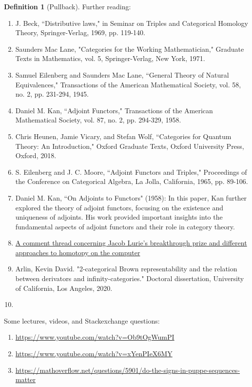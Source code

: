 \documentclass{book}
\theoremstyle{definition}
\newtheorem{definition}{Definition}
\begin{document}
\begin{definition}[Pullback]
Further reading:

\begin{enumerate}
\item J. Beck, ``Distributive laws," in Seminar on Triples and Categorical Homology Theory, Springer-Verlag, 1969, pp. 119-140.
\item Saunders Mac Lane, "Categories for the Working Mathematician," Graduate Texts in Mathematics, vol. 5, Springer-Verlag, New York, 1971.
\item Samuel Eilenberg and Saunders Mac Lane, ``General Theory of Natural Equivalences," Transactions of the American Mathematical Society, vol. 58, no. 2, pp. 231-294, 1945.
\item Daniel M. Kan, ``Adjoint Functors," Transactions of the American Mathematical Society, vol. 87, no. 2, pp. 294-329, 1958.
\item Chris Heunen, Jamie Vicary, and Stefan Wolf, ``Categories for Quantum Theory: An Introduction," Oxford Graduate Texts, Oxford University Press, Oxford, 2018.
\item S. Eilenberg and J. C. Moore, ``Adjoint Functors and Triples," Proceedings of the Conference on Categorical Algebra, La Jolla, California, 1965, pp. 89-106.
\item Daniel M. Kan, ``On Adjoints to Functors" (1958): In this paper, Kan further explored the theory of adjoint functors, focusing on the existence and uniqueness of adjoints. His work provided important insights into the fundamental aspects of adjoint functors and their role in category theory.
\item \href{https://mathematicswithoutapologies.wordpress.com/2015/05/13/univalent-foundations-no-comment/}{A comment thread concerning Jacob Lurie's breakthrough prize and different approaches to homotopy on the computer}
\item Arlin, Kevin David. "2-categorical Brown representability and the relation between derivators and infinity-categories." Doctoral dissertation, University of California, Los Angeles, 2020.
\item 
\end{enumerate}

Some lectures, videos, and Stackexchange questions:

\begin{enumerate}
\item \url{https://www.youtube.com/watch?v=Ob9tOgWumPI}
\item \url{https://www.youtube.com/watch?v=xYenPIeX6MY}
\item \url{https://mathoverflow.net/questions/5901/do-the-signs-in-puppe-sequences-matter}
\end{enumerate}


\end{definition}
\end{document}
